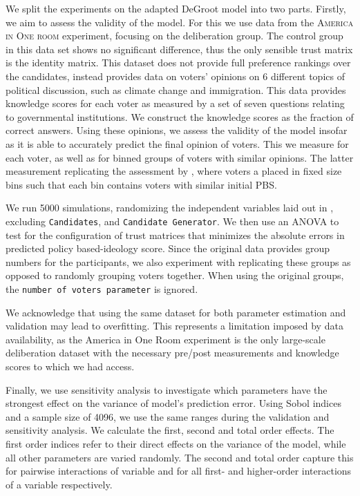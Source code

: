 We split the experiments on the adapted DeGroot model into two parts. Firstly,
we aim to assess the validity of the model. For this we use data from the
\textsc{America in One room} experiment, focusing on the deliberation group.
The control group in this data set shows no significant difference, thus the
only sensible trust matrix is the identity matrix. This dataset does not
provide full preference rankings over the candidates, instead provides data on
voters' opinions on 6 different topics of political discussion, such as climate
change and immigration. This data provides knowledge scores for each voter as
measured by a set of seven questions relating to governmental institutions. We
construct the knowledge scores as the fraction of correct answers. Using these
opinions, we assess the validity of the model insofar as it is able to
accurately predict the final opinion of voters. This we measure for each voter,
as well as for binned groups of voters with similar opinions. The latter
measurement replicating the assessment by
\citet{fishkinCanDeliberationHave2024}, where voters a placed in fixed size bins such that each bin contains voters with similar initial PBS.

We run 5000 simulations, randomizing the independent variables laid out in
, excluding \texttt{Candidates}, and
\texttt{Candidate Generator}. We then use an ANOVA to test for the
configuration of trust matrices that minimizes the absolute errors in predicted
policy based-ideology score. Since the original data provides group numbers for
the participants, we also experiment with
replicating these groups as opposed to randomly grouping voters together. When
using the original groups, the \texttt{number of voters parameter} is ignored.

We acknowledge that using the same dataset for both parameter estimation and
validation may lead to overfitting. This represents a limitation imposed by
data availability, as the America in One Room experiment is the only
large-scale deliberation dataset with the necessary pre/post measurements and
knowledge scores to which we had access.





Finally, we use sensitivity analysis to investigate which parameters have the
strongest effect on the variance of model's prediction error. Using Sobol
indices and a sample size of 4096, we use the same ranges during the validation and sensitivity analysis. We calculate the first, second and total
order effects. The first order indices refer to their direct effects on the
variance of the model, while all other parameters are varied randomly. The second and
total order capture this for pairwise interactions of variable and for all
first- and higher-order interactions of a variable respectively.


